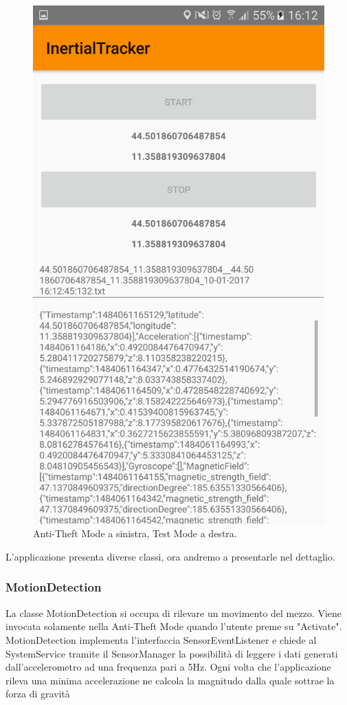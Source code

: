 \documentclass[12pt,a4paper,openright,twoside]{report}
\begin{document}
\begin{figure}[h!]
\includegraphics[scale=0.1]{MainActivity} 
\caption{Anti-Theft Mode a sinistra, Test Mode a destra.} 
\end{figure}

L'applicazione presenta diverse classi, ora andremo a presentarle nel dettaglio.
\subsubsection*{MotionDetection}
La classe MotionDetection si occupa di rilevare un movimento del mezzo. Viene invocata solamente nella Anti-Theft Mode quando l'utente preme su "Activate". \\
MotionDetection implementa l'interfaccia SensorEventListener e chiede al SystemService tramite il SensorManager la possibilità di leggere i dati generati dall'accelerometro ad una frequenza pari a 5Hz.
Ogni volta che l'applicazione rileva una minima accelerazione ne calcola la magnitudo dalla quale sottrae la forza di gravità
\end{document}
